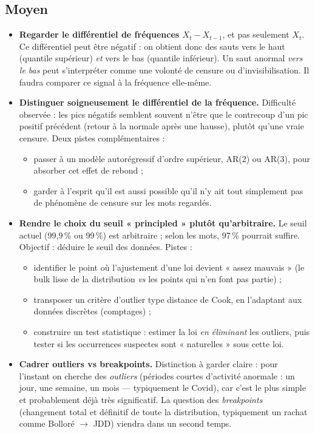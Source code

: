 \documentclass[12pt,a4paper]{article}
\begin{document}
\subsection*{Moyen}

\begin{itemize}
    \item \textbf{Regarder le différentiel de fréquences $X_t - X_{t-1}$}, et pas seulement
    $X_t$. Ce différentiel peut être négatif : on obtient donc des sauts vers le haut
    (quantile supérieur) \emph{et} vers le bas (quantile inférieur). Un saut anormal
    \emph{vers le bas} peut s'interpréter comme une volonté de censure ou d'invisibilisation.
    Il faudra comparer ce signal à la fréquence elle-même.

    \item \textbf{Distinguer soigneusement le différentiel de la fréquence.}
    Difficulté observée : les pics négatifs semblent souvent n'être que le
    contrecoup d'un pic positif précédent (retour à la normale après une hausse),
    plutôt qu'une vraie censure. Deux pistes complémentaires :
    \begin{itemize}
        \item passer à un modèle autorégressif d'ordre supérieur, AR(2) ou AR(3),
        pour absorber cet effet de rebond ;
        \item garder à l'esprit qu'il est aussi possible qu'il n'y ait tout simplement
        pas de phénomène de censure sur les mots regardés.
    \end{itemize}

    \item \textbf{Rendre le choix du seuil « principled » plutôt qu'arbitraire.}
    Le seuil actuel (99{,}9\,\% ou 99\,\%) est arbitraire ; selon les mots, 97\,\%
    pourrait suffire. Objectif : déduire le seuil des données. Pistes :
    \begin{itemize}
        \item identifier le point où l'ajustement d'une loi devient « assez mauvais »
        (le bulk lisse de la distribution \emph{vs} les points qui n'en font pas partie) ;
        \item transposer un critère d'outlier type distance de Cook, en l'adaptant
        aux données discrètes (comptages) ;
        \item construire un test statistique : estimer la loi \emph{en éliminant} les
        outliers, puis tester si les occurrences suspectes sont « naturelles » sous cette loi.
    \end{itemize}

    \item \textbf{Cadrer outliers vs breakpoints.} Distinction à garder claire :
    pour l'instant on cherche des \emph{outliers} (périodes courtes d'activité anormale :
    un jour, une semaine, un mois — typiquement le Covid), car c'est le plus simple et
    probablement déjà très significatif. La question des \emph{breakpoints} (changement
    total et définitif de toute la distribution, typiquement un rachat comme
    Bolloré $\to$ JDD) viendra dans un second temps.
\end{itemize}
\end{document}
